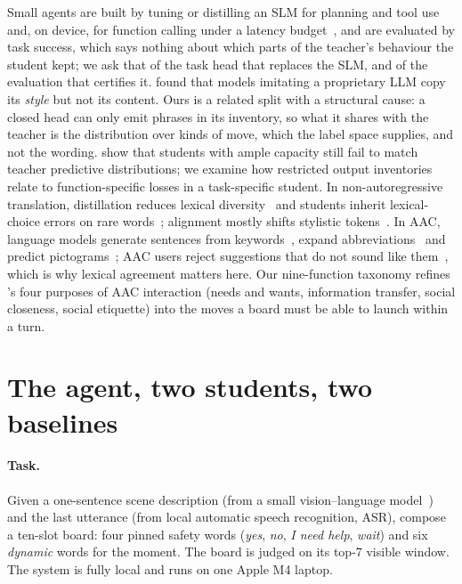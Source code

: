 Small agents are built by tuning or distilling an SLM for planning and tool
use~\citep{agenttuning2023,kang2025,hsieh2023} and, on device, for function
calling under a latency budget~\citep{octopus2024,tinyagent2024}, and are
evaluated by task success, which says nothing about which parts of the
teacher's behaviour the student kept; we ask that of the task head that
replaces the SLM, and of the evaluation that certifies it.
\citet{gudibande2023} found that models imitating a proprietary LLM copy its
\emph{style} but not its content. Ours is a related split with a structural
cause: a closed head can only emit phrases in its inventory, so what it
shares with the teacher is the distribution over kinds of move, which the
label space supplies, and not the wording. \citet{stanton2021} show that
students with ample capacity still fail to match teacher predictive
distributions; we examine how restricted output inventories relate to
function-specific losses in a task-specific student. In non-autoregressive translation, distillation reduces lexical
diversity~\citep{zhou2020,xu2021} and students inherit lexical-choice
errors on rare words~\citep{ding2021}; alignment mostly shifts stylistic
tokens~\citep{lin2023}. In AAC, language models generate sentences from
keywords~\citep{shen2022}, expand abbreviations~\citep{cai2022} and predict
pictograms~\citep{pereira2024}; AAC users reject suggestions that do not
sound like them~\citep{valencia2023}, which is why lexical agreement
matters here. Our nine-function taxonomy refines
\citet{light1988}'s four purposes of AAC interaction (needs and wants,
information transfer, social closeness, social etiquette) into the moves
a board must be able to launch within a turn.

\section{The agent, two students, two baselines}
\label{sec:setting}

\paragraph{Task.}
Given a one-sentence scene description (from a small vision--language
model~\citep{qwen25vl}) and the last utterance (from local automatic speech
recognition, ASR), compose a ten-slot board: four pinned safety words
(\emph{yes}, \emph{no}, \emph{I need help}, \emph{wait}) and six
\emph{dynamic} words for the moment. The board is judged on its top-7
visible window. The system is fully local and runs on one Apple M4 laptop.

